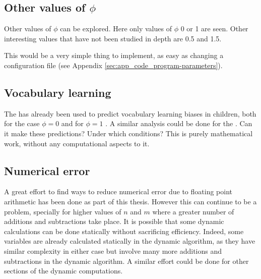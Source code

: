 \subsection{Other values of $\phi$}
\label{sec:discussion_future-work_phi}

Other values of $\phi$ can be explored.
Here only values of $\phi$ 0 or 1 are seen.
Other interesting values that have not been studied in depth are 0.5 and 1.5.

This would be a very simple thing to implement, as easy as changing a configuration file (see Appendix \ref{sec:app_code_program-parameters}).

\subsection{Vocabulary learning}
\label{sec:discussion_future-work_vocabulary-learning}

The \firstmodel{} has already been used to predict vocabulary learning biases in children, both for the case $\phi=0$ \cite{Ferrer2017a} and for $\phi=1$ \cite{Carrera2021a}.
A similar analysis could be done for the \secondmodel{}.
Can it make these predictions? Under which conditions? This is purely mathematical work, without any computational aspects to it.

\subsection{Numerical error}
\label{sec:discussion_future-work_numerical-error}

A great effort to find ways to reduce numerical error due to floating point arithmetic has been done as part of this thesis.
However this can continue to be a problem, specially for higher values of $n$ and $m$ where a greater number of additions and subtractions take place.
It is possible that some dynamic calculations can be done statically without sacrificing efficiency.
Indeed, some variables are already calculated statically in the dynamic algorithm, as they have similar complexity in either case but involve many more additions and subtractions in the dynamic algorithm.
A similar effort could be done for other sections of the dynamic computations.

